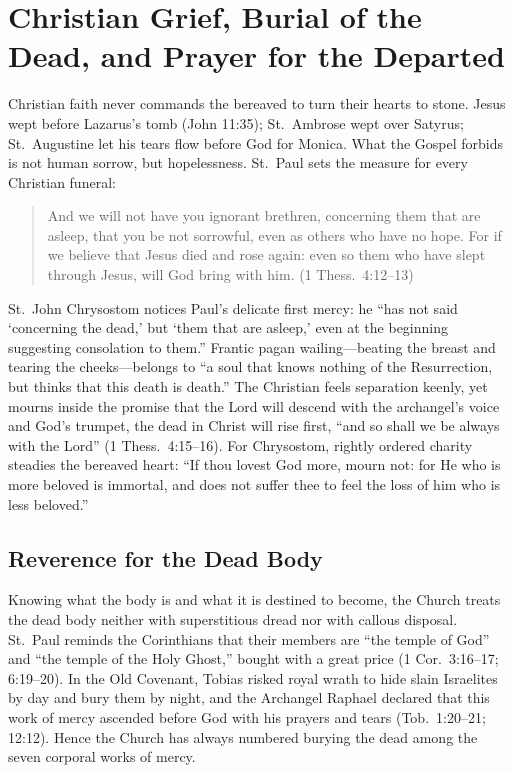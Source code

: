 \section{Christian Grief, Burial of the Dead, and Prayer for the Departed}

Christian faith never commands the bereaved to turn their hearts to stone. Jesus wept before Lazarus's tomb (John 11:35); St.\ Ambrose wept over Satyrus; St.\ Augustine let his tears flow before God for Monica. What the Gospel forbids is not human sorrow, but hopelessness. St.\ Paul sets the measure for every Christian funeral:

\begin{quote}
And we will not have you ignorant brethren, concerning them that are asleep, that you be not sorrowful, even as others who have no hope. For if we believe that Jesus died and rose again: even so them who have slept through Jesus, will God bring with him. (1 Thess.\ 4:12--13)
\end{quote}

St.\ John Chrysostom notices Paul's delicate first mercy: he ``has not said `concerning the dead,' but `them that are asleep,' even at the beginning suggesting consolation to them.'' Frantic pagan wailing---beating the breast and tearing the cheeks---belongs to ``a soul that knows nothing of the Resurrection, but thinks that this death is death.'' The Christian feels separation keenly, yet mourns inside the promise that the Lord will descend with the archangel's voice and God's trumpet, the dead in Christ will rise first, ``and so shall we be always with the Lord'' (1 Thess.\ 4:15--16). For Chrysostom, rightly ordered charity steadies the bereaved heart: ``If thou lovest God more, mourn not: for He who is more beloved is immortal, and does not suffer thee to feel the loss of him who is less beloved.''

\subsection{Reverence for the Dead Body}

Knowing what the body is and what it is destined to become, the Church treats the dead body neither with superstitious dread nor with callous disposal. St.\ Paul reminds the Corinthians that their members are ``the temple of God'' and ``the temple of the Holy Ghost,'' bought with a great price (1 Cor.\ 3:16--17; 6:19--20). In the Old Covenant, Tobias risked royal wrath to hide slain Israelites by day and bury them by night, and the Archangel Raphael declared that this work of mercy ascended before God with his prayers and tears (Tob.\ 1:20--21; 12:12). Hence the Church has always numbered burying the dead among the seven corporal works of mercy.

